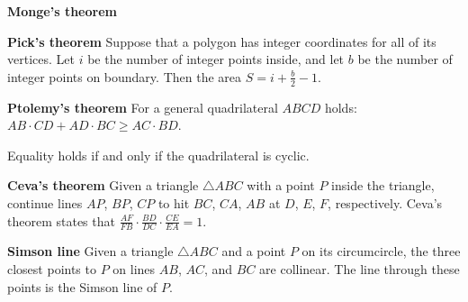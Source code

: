 \textbf{Monge's theorem}\\

\textbf{Pick's theorem}
Suppose that a polygon has integer coordinates for all of its vertices. 
Let $i$ be the number of integer points inside, and let $b$ be the number of integer points on boundary. 
Then the area $S = i + \tfrac{b}{2} - 1$.

\textbf{Ptolemy's theorem}
For a general quadrilateral $ABCD$ holds:
$AB \cdot CD + AD \cdot BC \ge AC \cdot BD$.

Equality holds if and only if the quadrilateral is cyclic.

\textbf{Ceva's theorem}
Given a triangle $\triangle ABC$ with a point $P$ inside the triangle,
continue lines $AP$, $BP$, $CP$ to hit $BC$, $CA$, $AB$ at $D$, $E$, $F$,
respectively.
Ceva's theorem states that
$\frac{AF}{FB} \cdot \frac{BD}{DC} \cdot \frac{CE}{EA} = 1$. 

\textbf{Simson line}
Given a triangle $\triangle ABC$ and a point $P$ on its circumcircle,
the three closest points to $P$ on lines $AB$, $AC$, and $BC$ are collinear.
The line through these points is the Simson line of $P$.

